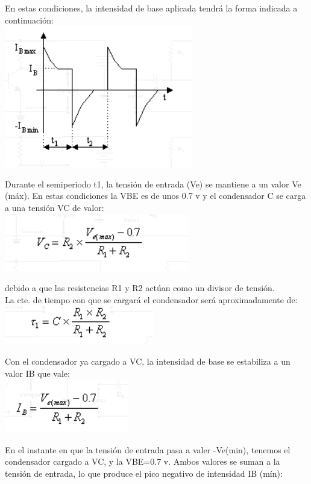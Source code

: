 \documentclass[10pt,a4paper]{article}
\begin{document}
\raggedright 
En estas condiciones, la intensidad de base aplicada tendrá la forma indicada a continuación:\\
\centering
\includegraphics[scale=1]{te.png}\\
\raggedright
Durante el semiperiodo t1, la tensión de entrada (Ve) se mantiene a un valor Ve (máx). En estas condiciones la VBE es de unos 0.7 v y el condensador C se carga a una tensión VC de valor:\\
\centering
\includegraphics[scale=.70]{cal.png}\\ 
\raggedright
debido a que las resistencias R1 y R2 actúan como un divisor de tensión.\\
La cte. de tiempo con que se cargará el condensador será aproximadamente de:\\
\centering
\includegraphics[scale=.70]{cal1.png}\\
\raggedright 
Con el condensador ya cargado a VC, la intensidad de base se estabiliza a un valor IB que vale:\\
\centering
\includegraphics[scale=.70]{cal2.png}\\
\raggedright 
En el instante en que la tensión de entrada pasa a valer -Ve(min), tenemos el condensador cargado a VC, y la VBE=0.7 v. Ambos valores se suman a la tensión de entrada, lo que produce el pico negativo de intensidad IB (mín):\\
\end{document}
